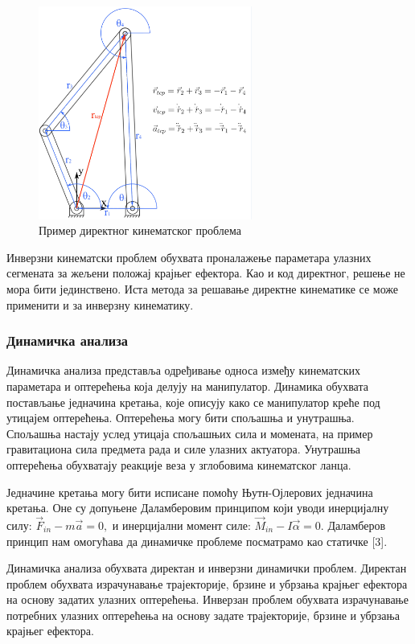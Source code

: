 \documentclass[12pt]{article}
\begin{document}
\begin{figure}[H]
    \centering
    \includegraphics[width=7cm]{figures/4bar.jpg}
    \caption{Пример директног кинематског проблема}
    \label{fig:дир_кин_пример}
\end{figure}

Инверзни кинематски проблем обухвата проналажење параметара улазних сегмената за жељени положај крајњег ефектора. Као и код директног, решење не мора бити јединствено. Иста метода за решавање директне кинематике се може применити и за инверзну кинематику.

\subsubsection{Динамичка анализа}
Динамичка анализа представља одређивање односа између кинематских параметара и оптерећења која делују на манипулатор. Динамика обухвата постављање једначина кретања, које описују како се манипулатор креће под утицајем оптерећења. Оптерећења могу бити спољашња и унутрашња. Спољашња настају услед утицаја спољашњих сила и момената, на пример гравитациона сила предмета рада и силе улазних актуатора. Унутрашња оптерећења обухватају реакције веза у зглобовима кинематског ланца.

Једначине кретања могу бити исписане помоћу Њутн-Ојлерових једначина кретања. Оне су допуњене Даламберовим принципом који уводи инерцијалну силу: $\vec{F}_{in} - m\vec{a} = 0,$ и инерцијални момент силе: $\vec{M}_{in} - I\vec{\alpha} = 0$. Даламберов принцип нам омогућава да динамичке проблеме посматрамо као статичке [3].

Динамичка анализа обухвата директан и инверзни динамички проблем. Директан проблем обухвата израчунавање трајекторије, брзине и убрзања крајњег ефектора на основу задатих улазних оптерећења. Инверзан проблем обухвата израчунавање потребних улазних оптерећења на основу задате трајекторије, брзине и убрзања крајњег ефектора.
\end{document}
